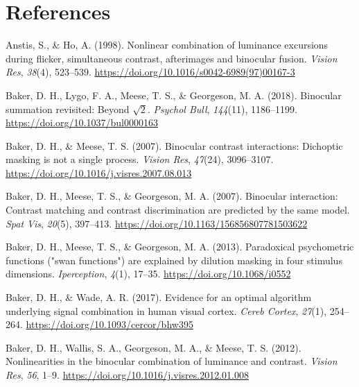 \documentclass[
]{article}
\newlength{\cslhangindent}
\newlength{\cslentryspacingunit} %
\newenvironment{CSLReferences}[2] %
 {%
  \setlength{\parindent}{0pt}
  \ifodd #1
  \let\oldpar\par
  \def\par{\hangindent=\cslhangindent\oldpar}
  \fi
  \setlength{\parskip}{#2\cslentryspacingunit}
 }%
 {}
\begin{document}
\hypertarget{references}{%
\section{References}\label{references}}

\hypertarget{refs}{}
\begin{CSLReferences}{1}{0}
\leavevmode{}%
Anstis, S., \& Ho, A. (1998). Nonlinear combination of luminance excursions during flicker, simultaneous contrast, afterimages and binocular fusion. \emph{Vision Res}, \emph{38}(4), 523--539. \url{https://doi.org/10.1016/s0042-6989(97)00167-3}

\leavevmode{}%
Baker, D. H., Lygo, F. A., Meese, T. S., \& Georgeson, M. A. (2018). Binocular summation revisited: Beyond \(\sqrt{2}\). \emph{Psychol Bull}, \emph{144}(11), 1186--1199. \url{https://doi.org/10.1037/bul0000163}

\leavevmode{}%
Baker, D. H., \& Meese, T. S. (2007). Binocular contrast interactions: Dichoptic masking is not a single process. \emph{Vision Res}, \emph{47}(24), 3096--3107. \url{https://doi.org/10.1016/j.visres.2007.08.013}

\leavevmode{}%
Baker, D. H., Meese, T. S., \& Georgeson, M. A. (2007). Binocular interaction: Contrast matching and contrast discrimination are predicted by the same model. \emph{Spat Vis}, \emph{20}(5), 397--413. \url{https://doi.org/10.1163/156856807781503622}

\leavevmode{}%
Baker, D. H., Meese, T. S., \& Georgeson, M. A. (2013). Paradoxical psychometric functions ("swan functions") are explained by dilution masking in four stimulus dimensions. \emph{Iperception}, \emph{4}(1), 17--35. \url{https://doi.org/10.1068/i0552}

\leavevmode{}%
Baker, D. H., \& Wade, A. R. (2017). Evidence for an optimal algorithm underlying signal combination in human visual cortex. \emph{Cereb Cortex}, \emph{27}(1), 254--264. \url{https://doi.org/10.1093/cercor/bhw395}

\leavevmode{}%
Baker, D. H., Wallis, S. A., Georgeson, M. A., \& Meese, T. S. (2012). Nonlinearities in the binocular combination of luminance and contrast. \emph{Vision Res}, \emph{56}, 1--9. \url{https://doi.org/10.1016/j.visres.2012.01.008}


\end{CSLReferences}
\end{document}
